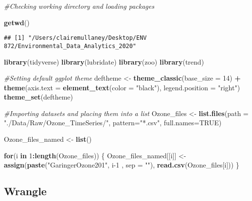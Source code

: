 \documentclass[]{article}
\newenvironment{Shaded}{\begin{snugshade}}{\end{snugshade}}
\newcommand{\CommentTok}[1]{\textcolor[rgb]{0.56,0.35,0.01}{\textit{#1}}}
\newcommand{\ControlFlowTok}[1]{\textcolor[rgb]{0.13,0.29,0.53}{\textbf{#1}}}
\newcommand{\DataTypeTok}[1]{\textcolor[rgb]{0.13,0.29,0.53}{#1}}
\newcommand{\DecValTok}[1]{\textcolor[rgb]{0.00,0.00,0.81}{#1}}
\newcommand{\KeywordTok}[1]{\textcolor[rgb]{0.13,0.29,0.53}{\textbf{#1}}}
\newcommand{\NormalTok}[1]{#1}
\newcommand{\OperatorTok}[1]{\textcolor[rgb]{0.81,0.36,0.00}{\textbf{#1}}}
\newcommand{\OtherTok}[1]{\textcolor[rgb]{0.56,0.35,0.01}{#1}}
\newcommand{\StringTok}[1]{\textcolor[rgb]{0.31,0.60,0.02}{#1}}
\begin{document}
\begin{Shaded}
\begin{Highlighting}[]
\CommentTok{#Checking working directory and loading packages}

\KeywordTok{getwd}\NormalTok{()}
\end{Highlighting}
\end{Shaded}

\begin{verbatim}
## [1] "/Users/clairemullaney/Desktop/ENV 872/Environmental_Data_Analytics_2020"
\end{verbatim}

\begin{Shaded}
\begin{Highlighting}[]
\KeywordTok{library}\NormalTok{(tidyverse)}
\KeywordTok{library}\NormalTok{(lubridate)}
\KeywordTok{library}\NormalTok{(zoo)}
\KeywordTok{library}\NormalTok{(trend)}

\CommentTok{#Setting default ggplot theme}
\NormalTok{deftheme <-}\StringTok{ }\KeywordTok{theme_classic}\NormalTok{(}\DataTypeTok{base_size =} \DecValTok{14}\NormalTok{) }\OperatorTok{+}
\StringTok{  }\KeywordTok{theme}\NormalTok{(}\DataTypeTok{axis.text =} \KeywordTok{element_text}\NormalTok{(}\DataTypeTok{color =} \StringTok{"black"}\NormalTok{), }
        \DataTypeTok{legend.position =} \StringTok{"right"}\NormalTok{)}
\KeywordTok{theme_set}\NormalTok{(deftheme)}

\CommentTok{#Importing datasets and placing them into a list}
\NormalTok{Ozone_files <-}\StringTok{ }\KeywordTok{list.files}\NormalTok{(}\DataTypeTok{path =} \StringTok{"./Data/Raw/Ozone_TimeSeries/"}\NormalTok{, }
                         \DataTypeTok{pattern=}\StringTok{"*.csv"}\NormalTok{, }\DataTypeTok{full.names=}\OtherTok{TRUE}\NormalTok{)}

\NormalTok{Ozone_files_named <-}\StringTok{ }\KeywordTok{list}\NormalTok{()}

\ControlFlowTok{for}\NormalTok{(i }\ControlFlowTok{in} \DecValTok{1}\OperatorTok{:}\KeywordTok{length}\NormalTok{(Ozone_files)) \{}
\NormalTok{  Ozone_files_named[[i]] <-}\StringTok{ }\KeywordTok{assign}\NormalTok{(}\KeywordTok{paste}\NormalTok{(}\StringTok{"GaringerOzone201"}\NormalTok{, i}\DecValTok{-1}\NormalTok{ , }\DataTypeTok{sep =} \StringTok{""}\NormalTok{), }\KeywordTok{read.csv}\NormalTok{(Ozone_files[i]))}
\NormalTok{\}}
\end{Highlighting}
\end{Shaded}

\hypertarget{wrangle}{%
\subsection{Wrangle}\label{wrangle}}
\end{document}
